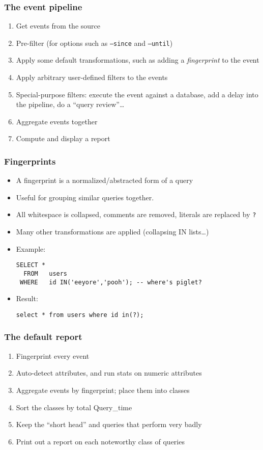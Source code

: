\begin{frame}
   \frametitle{The event pipeline}
   \begin{enumerate}
      \item Get events from the source
      \item Pre-filter (for options such as \texttt{--since} and \texttt{--until})
      \item Apply some default transformations, such as adding a \emph{fingerprint} to the event
      \item Apply arbitrary user-defined filters to the events
      \item Special-purpose filters: execute the event against a database, add a delay into the pipeline, do a ``query review''\dots
      \item Aggregate events together
      \item Compute and display a report
   \end{enumerate}
\end{frame}

\begin{frame}[fragile]
   \frametitle{Fingerprints}
   \begin{itemize}
      \item A fingerprint is a normalized/abstracted form of a query
      \item Useful for grouping similar queries together.
      \item All whitespace is collapsed, comments are removed, literals are replaced by \texttt{?}
      \item Many other transformations are applied (collapsing IN lists\dots)
      \item Example:
\begin{verbatim}
SELECT *
  FROM   users
 WHERE   id IN('eeyore','pooh'); -- where's piglet?
\end{verbatim}
      \item Result:
\begin{verbatim}
select * from users where id in(?);
\end{verbatim}
   \end{itemize}
\end{frame}

\begin{frame}
   \frametitle{The default report}
   \begin{enumerate}
      \item Fingerprint every event
      \item Auto-detect attributes, and run stats on numeric attributes
      \item Aggregate events by fingerprint; place them into classes
      \item Sort the classes by total Query\_time
      \item Keep the ``short head'' and queries that perform very badly
      \item Print out a report on each noteworthy class of queries
   \end{enumerate}
\end{frame}

